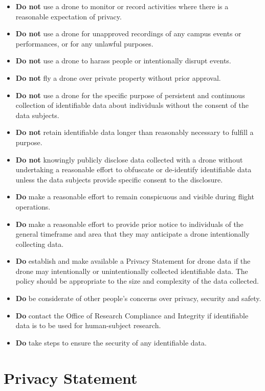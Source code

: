 \documentclass[
  12pt,
]{book}
\begin{document}
\begin{itemize}
\item
  \textbf{Do not} use a drone to monitor or record activities where there is a reasonable expectation of privacy.
\item
  \textbf{Do not} use a drone for unapproved recordings of any campus events or performances, or for any unlawful purposes.
\item
  \textbf{Do not} use a drone to harass people or intentionally disrupt events.
\item
  \textbf{Do not} fly a drone over private property without prior approval.
\item
  \textbf{Do not} use a drone for the specific purpose of persistent and continuous collection of identifiable data about individuals without the consent of the data subjects.
\item
  \textbf{Do not} retain identifiable data longer than reasonably necessary to fulfill a purpose.
\item
  \textbf{Do not} knowingly publicly disclose data collected with a drone without undertaking a reasonable effort to obfuscate or de-identify identifiable data unless the data subjects provide specific consent to the disclosure.
\item
  \textbf{Do} make a reasonable effort to remain conspicuous and visible during flight operations.
\item
  \textbf{Do} make a reasonable effort to provide prior notice to individuals of the general timeframe and area that they may anticipate a drone intentionally collecting data.
\item
  \textbf{Do} establish and make available a Privacy Statement for drone data if the drone may intentionally or unintentionally collected identifiable data. The policy should be appropriate to the size and complexity of the data collected.
\item
  \textbf{Do} be considerate of other people's concerns over privacy, security and safety.
\item
  \textbf{Do} contact the Office of Research Compliance and Integrity if identifiable data is to be used for human-subject research.
\item
  \textbf{Do} take steps to ensure the security of any identifiable data.
\end{itemize}

\hypertarget{privacy-statement}{%
\section{Privacy Statement}\label{privacy-statement}}
\end{document}
